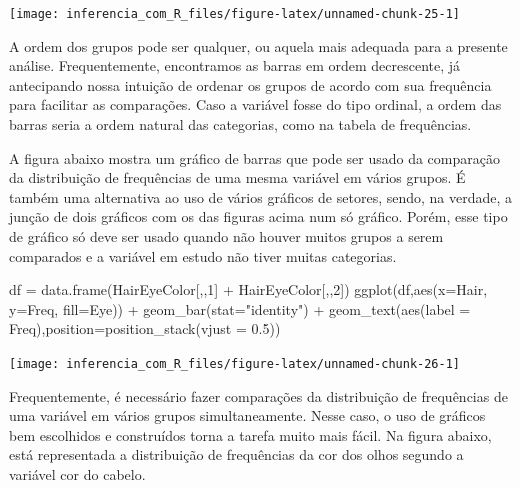 \documentclass[
]{book}
\newenvironment{Shaded}{\begin{snugshade}}{\end{snugshade}}
\newcommand{\AttributeTok}[1]{\textcolor[rgb]{0.77,0.63,0.00}{#1}}
\newcommand{\DecValTok}[1]{\textcolor[rgb]{0.00,0.00,0.81}{#1}}
\newcommand{\FloatTok}[1]{\textcolor[rgb]{0.00,0.00,0.81}{#1}}
\newcommand{\FunctionTok}[1]{\textcolor[rgb]{0.00,0.00,0.00}{#1}}
\newcommand{\NormalTok}[1]{#1}
\newcommand{\OtherTok}[1]{\textcolor[rgb]{0.56,0.35,0.01}{#1}}
\newcommand{\SpecialCharTok}[1]{\textcolor[rgb]{0.00,0.00,0.00}{#1}}
\newcommand{\StringTok}[1]{\textcolor[rgb]{0.31,0.60,0.02}{#1}}
\begin{document}
\begin{center}\texttt{[image: inferencia\_com\_R\_files/figure-latex/unnamed-chunk-25-1]} \end{center}

A ordem dos grupos pode ser qualquer, ou aquela mais adequada para a presente análise. Frequentemente, encontramos as barras em ordem decrescente, já antecipando nossa intuição de ordenar os grupos de acordo com sua frequência para facilitar as comparações. Caso a variável fosse do tipo ordinal, a ordem das barras seria a ordem natural das categorias, como na tabela de frequências.

A figura abaixo mostra um gráfico de barras que pode ser usado da comparação da distribuição de frequências de uma mesma variável em vários grupos. É também uma alternativa ao uso de vários gráficos de setores, sendo, na verdade, a junção de dois gráficos com os das figuras acima num só gráfico. Porém, esse tipo de gráfico só deve ser usado quando não houver muitos grupos a serem comparados e a variável em estudo não tiver muitas categorias.

\begin{Shaded}
\begin{Highlighting}[]
\NormalTok{df }\OtherTok{=} \FunctionTok{data.frame}\NormalTok{(HairEyeColor[,,}\DecValTok{1}\NormalTok{] }\SpecialCharTok{+}\NormalTok{ HairEyeColor[,,}\DecValTok{2}\NormalTok{])}
\FunctionTok{ggplot}\NormalTok{(df,}\FunctionTok{aes}\NormalTok{(}\AttributeTok{x=}\NormalTok{Hair, }\AttributeTok{y=}\NormalTok{Freq, }\AttributeTok{fill=}\NormalTok{Eye)) }\SpecialCharTok{+}
  \FunctionTok{geom\_bar}\NormalTok{(}\AttributeTok{stat=}\StringTok{"identity"}\NormalTok{) }\SpecialCharTok{+}
  \FunctionTok{geom\_text}\NormalTok{(}\FunctionTok{aes}\NormalTok{(}\AttributeTok{label =}\NormalTok{ Freq),}\AttributeTok{position=}\FunctionTok{position\_stack}\NormalTok{(}\AttributeTok{vjust =} \FloatTok{0.5}\NormalTok{))}
\end{Highlighting}
\end{Shaded}

\begin{center}\texttt{[image: inferencia\_com\_R\_files/figure-latex/unnamed-chunk-26-1]} \end{center}

Frequentemente, é necessário fazer comparações da distribuição de frequências de uma variável em vários grupos simultaneamente. Nesse caso, o uso de gráficos bem escolhidos e construídos torna a tarefa muito mais fácil. Na figura abaixo, está representada a distribuição de frequências da cor dos olhos segundo a variável cor do cabelo.
\end{document}
